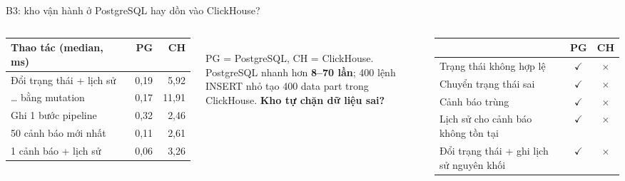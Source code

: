 \documentclass[aspectratio=169,11pt]{beamer}
\newcommand{\good}{{\color{okcol}$\checkmark$}}
\newcommand{\bad}{{\color{accent}$\times$}}
\begin{document}
\begin{frame}{B3: kho vận hành ở PostgreSQL hay dồn vào ClickHouse?}
  \begin{columns}[T]
    \footnotesize
    \setlength{\tabcolsep}{4pt}\begin{tabular}{L{4.3cm} r r}
      \toprule
      \textbf{Thao tác} (median, ms) & \textbf{PG} & \textbf{CH} \\
      \midrule
      Đổi trạng thái + lịch sử & 0,19 & 5,92 \\
      … bằng mutation & 0,17 & 11,91 \\
      Ghi 1 bước pipeline & 0,32 & 2,46 \\
      50 cảnh báo mới nhất & 0,11 & 2,61 \\
      1 cảnh báo + lịch sử & 0,06 & 3,26 \\
      \bottomrule
    \end{tabular}\\[4pt]
    PG = PostgreSQL, CH = ClickHouse. PostgreSQL nhanh hơn \textbf{8--70 lần}; 400 lệnh INSERT nhỏ tạo 400 data part trong ClickHouse.
    \footnotesize
    \textbf{Kho tự chặn dữ liệu sai?}\par\smallskip
    \setlength{\tabcolsep}{4pt}\begin{tabular}{L{4.1cm} c c}
      \toprule
      & \textbf{PG} & \textbf{CH} \\
      \midrule
      Trạng thái không hợp lệ & \good & \bad \\
      Chuyển trạng thái sai & \good & \bad \\
      Cảnh báo trùng & \good & \bad \\
      Lịch sử cho cảnh báo không tồn tại & \good & \bad \\
      Đổi trạng thái + ghi lịch sử nguyên khối & \good & \bad \\
      \bottomrule
    \end{tabular}
  \end{columns}
\end{frame}
\end{document}
